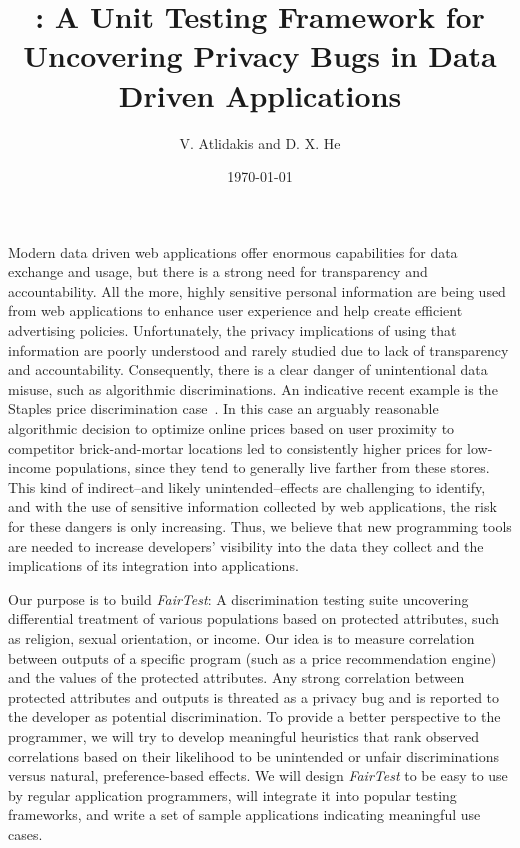 \documentclass{article}
\title{\thetool: A Unit Testing Framework for Uncovering Privacy Bugs in Data
Driven Applications}
\author{V. Atlidakis and D. X. He}
\date{\today}
\newcommand{\thetool}{{\it FairTest}\xspace}
\newcommand{\heading}[1]{\noindent{\bf{#1}}}
\begin{document}
\maketitle

\heading{Motivation.}
Modern data driven web applications offer enormous capabilities for data
exchange and usage,
but there is a strong need for transparency and accountability.
All the more, highly sensitive personal information are being used from web
applications to enhance user experience and help create efficient advertising
policies. Unfortunately, the privacy implications of using that information are
poorly understood and rarely studied due to lack of transparency and
accountability. Consequently, there is a clear danger of unintentional data
misuse, such as algorithmic discriminations. An indicative recent
example is the Staples price discrimination case~\cite{Staples}.
In this case an arguably reasonable algorithmic decision to optimize online
prices based on user proximity to competitor brick-and-mortar locations led to
consistently higher prices for low-income populations, since they tend to
generally live farther from these stores. This kind of indirect--and likely
unintended--effects are challenging to identify, and with the use of sensitive
information collected by web applications, the risk for these dangers is only
increasing. Thus, we believe that new programming tools are needed to increase
developers’ visibility into the data they collect and the implications of its
integration into applications.

\heading{Goals.}
Our purpose is to build \thetool: A discrimination testing suite uncovering
differential treatment of various populations based on protected
attributes, such as religion, sexual orientation, or income. Our idea is to
measure correlation between outputs of a specific program (such as a price
recommendation engine) and the values of the protected attributes. Any strong
correlation between protected attributes and outputs is threated as a privacy
bug and is reported to the
developer as potential discrimination. To provide a better perspective to the
programmer, we will try to develop meaningful heuristics that rank observed
correlations based on their likelihood to be unintended or unfair
discriminations versus natural, preference-based effects. We will design
{\it FairTest} to be easy to use by regular application programmers,
will integrate
it into popular testing frameworks, and write a set of sample applications
indicating meaningful use cases.
\end{document}
